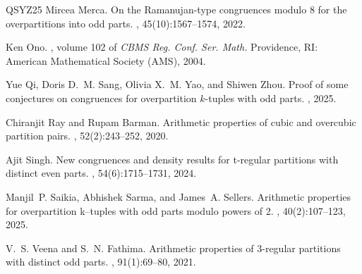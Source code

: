 \documentclass[12pt,reqno]{amsart}
\numberwithin{equation}{section}
\begin{document}
\begin{thebibliography}{QSYZ25}
Mircea Merca.
\newblock On the {Ramanujan}-type congruences modulo 8 for the overpartitions into odd parts.
, 45(10):1567--1574, 2022.

Ken Ono.
, volume 102 of {\em CBMS Reg. Conf. Ser. Math.}
\newblock Providence, RI: American Mathematical Society (AMS), 2004.

Yue Qi, Doris D.~M. Sang, Olivia X.~M. Yao, and Shiwen Zhou.
\newblock Proof of some conjectures on congruences for overpartition \(k\)-tuples with odd parts.
, 2025.

Chiranjit Ray and Rupam Barman.
\newblock Arithmetic properties of cubic and overcubic partition pairs.
, 52(2):243--252, 2020.

Ajit Singh.
\newblock New congruences and density results for t-regular partitions with distinct even parts.
, 54(6):1715--1731, 2024.

Manjil~P. Saikia, Abhishek Sarma, and James~A. Sellers.
\newblock Arithmetic properties for overpartition k--tuples with odd parts modulo powers of 2.
, 40(2):107--123, 2025.

V.~S. Veena and S.~N. Fathima.
\newblock Arithmetic properties of 3-regular partitions with distinct odd parts.
, 91(1):69--80, 2021.

\end{thebibliography}
\end{document}
